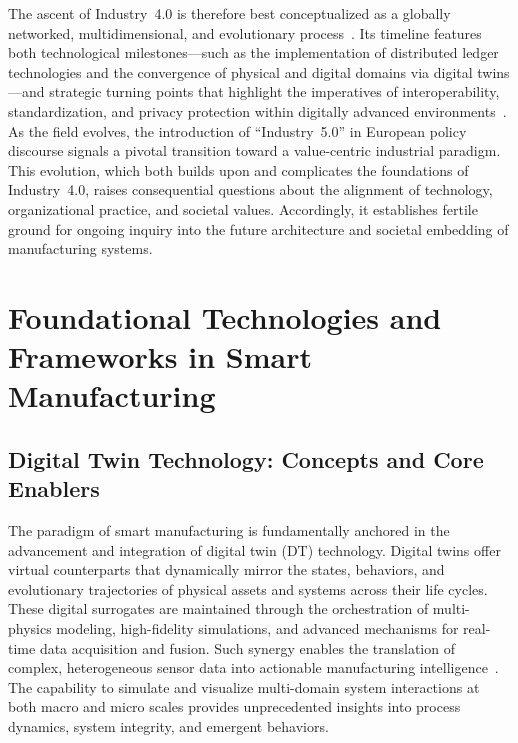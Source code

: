 \documentclass[sigconf]{acmart}
\begin{document}
The ascent of Industry~4.0 is therefore best conceptualized as a globally networked, multidimensional, and evolutionary process~\cite{ref24}. Its timeline features both technological milestones---such as the implementation of distributed ledger technologies and the convergence of physical and digital domains via digital twins---and strategic turning points that highlight the imperatives of interoperability, standardization, and privacy protection within digitally advanced environments~\cite{ref67,ref91}. As the field evolves, the introduction of ``Industry~5.0'' in European policy discourse signals a pivotal transition toward a value-centric industrial paradigm. This evolution, which both builds upon and complicates the foundations of Industry~4.0, raises consequential questions about the alignment of technology, organizational practice, and societal values. Accordingly, it establishes fertile ground for ongoing inquiry into the future architecture and societal embedding of manufacturing systems.

\section{Foundational Technologies and Frameworks in Smart Manufacturing}

\subsection{Digital Twin Technology: Concepts and Core Enablers}

The paradigm of smart manufacturing is fundamentally anchored in the advancement and integration of digital twin (DT) technology. Digital twins offer virtual counterparts that dynamically mirror the states, behaviors, and evolutionary trajectories of physical assets and systems across their life cycles. These digital surrogates are maintained through the orchestration of multi-physics modeling, high-fidelity simulations, and advanced mechanisms for real-time data acquisition and fusion. Such synergy enables the translation of complex, heterogeneous sensor data into actionable manufacturing intelligence~\cite{ref91}. The capability to simulate and visualize multi-domain system interactions at both macro and micro scales provides unprecedented insights into process dynamics, system integrity, and emergent behaviors.
\end{document}
